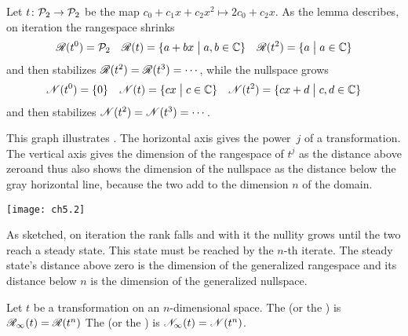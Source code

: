 \begin{example} \label{exam:PolyRankFalls}
Let \( \mbox{$t\colon \mathcal{P}_2\to \mathcal{P}_2$} \) be the map
\( c_0+c_1x+c_2x^2 \mapsto 2c_0+c_2x. \)
As the lemma describes, on
iteration the rangespace shrinks
\begin{equation*}
  \mathscr{R}(t^0)=\mathcal{P}_2
    \quad
  \mathscr{R}(t)=\mbox{$\{a+bx\bigm| a,b\in\mathbb{C}\}$}
    \quad
  \mathscr{R}(t^2)=\mbox{$\{a\bigm| a\in\mathbb{C}\}$}
\end{equation*}
and then stabilizes $\mathscr{R}(t^2)=\mathscr{R}(t^3)=\cdots$,
while the nullspace grows
\begin{equation*}
  \mathscr{N}(t^0)=\mbox{$\{0\}$}
    \quad
  \mathscr{N}(t)=\mbox{$\{cx\bigm| c\in\mathbb{C}\}$}
    \quad
  \mathscr{N}(t^2)=\mbox{$\{cx+d\bigm| c,d\in\mathbb{C}\}$}
\end{equation*}
and then stabilizes $\mathscr{N}(t^2)=\mathscr{N}(t^3)=\cdots$.
\end{example}

This graph illustrates .
The horizontal axis gives the power~$j$ of a transformation.
The vertical axis gives
the dimension of the rangespace of $t^j$
as the distance above zero\Dash and thus also shows the dimension of the 
nullspace as the distance below the gray horizontal line, 
because the two add to the dimension $n$ of the domain.
\begin{center}
  \texttt{[image: ch5.2]}
\end{center}
As sketched, on iteration 
the rank falls and with it the nullity grows 
until the two reach a steady state.
This state must be reached by the $n$-th iterate.
The steady state's distance above zero is the dimension of the 
generalized rangespace
and its distance below $n$ is the dimension of
the generalized nullspace.

\begin{definition}
Let \( t \) be a transformation on an \( n \)-dimensional space.
The %
(or the %
)
is $\mathscr{R}_\infty(t)=\mathscr{R}(t^n)$
The %
(or the %
)
is $\mathscr{N}_\infty(t)=\mathscr{N}(t^n)$.
\end{definition}

